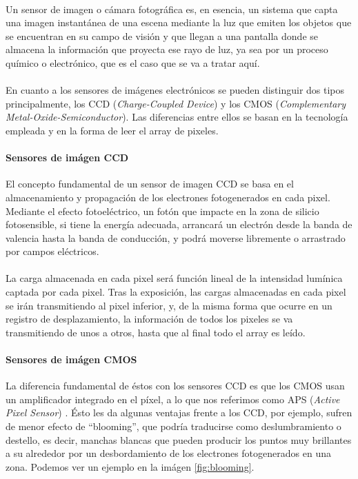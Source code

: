 \paragraph{}
Un sensor de imagen o cámara fotográfica es, en esencia, un sistema que capta
una imagen instantánea de una escena mediante la luz que emiten los objetos que
se encuentran en su campo de visión y que llegan a una pantalla donde se almacena
la información que proyecta ese rayo de luz, ya sea por un proceso químico
o electrónico, que es el caso que se va a tratar aquí.

\paragraph{}
En cuanto a los sensores de imágenes electrónicos se pueden distinguir dos tipos
principalmente, los CCD (\textit{Charge-Coupled Device}) y los CMOS
(\textit{Complementary Metal-Oxide-Semiconductor}). Las diferencias entre ellos
se basan en la tecnología empleada y en la forma de leer el array de pixeles.

\paragraph{Sensores de imágen CCD}
El concepto fundamental de un sensor de imagen CCD se basa en el almacenamiento
y propagación de los electrones fotogenerados en cada pixel. Mediante el efecto
fotoeléctrico, un fotón que impacte en la zona de silicio fotosensible, si tiene
la energía adecuada, arrancará un electrón desde la banda de valencia hasta la
banda de conducción, y podrá moverse libremente o arrastrado por campos eléctricos.

\paragraph{}
La carga almacenada en cada pixel será función lineal de la intensidad lumínica
captada por cada pixel. Tras la exposición, las cargas almacenadas en cada pixel
se irán transmitiendo al pixel inferior, y, de la misma forma que ocurre en un
registro de desplazamiento, la información de todos los pixeles se va transmitiendo
de unos a otros, hasta que al final todo el array es leído.\cite{Nakamura2005}

\paragraph{Sensores de imágen CMOS}
La diferencia fundamental de éstos con los sensores CCD es que los CMOS usan un
amplificador integrado en el píxel, a lo que nos referimos como APS (\textit{Active Pixel Sensor})
\cite{Fossum1993}. Ésto les da algunas ventajas
frente a los CCD, por ejemplo, sufren de menor efecto de ``blooming'', que podría
traducirse como deslumbramiento o destello, es decir, manchas blancas que pueden
producir los puntos muy brillantes a su alrededor por un desbordamiento de los
electrones fotogenerados en una zona. Podemos ver un ejemplo en la
imágen \ref{fig:blooming}\cite{Commons:Kriplozoik}.

